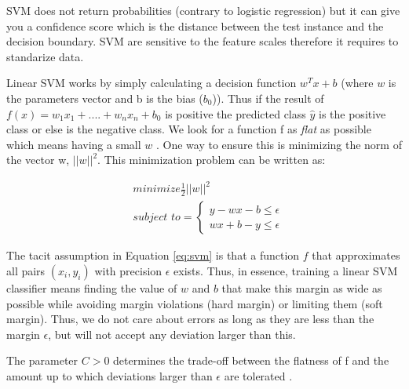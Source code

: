 \documentclass[11pt]{article}
\begin{document}
SVM does not return probabilities (contrary to logistic regression) but it can give you a confidence score which is the distance between the test instance and the decision boundary. SVM are sensitive to the feature scales therefore it requires to standarize data. 

Linear SVM works by simply calculating a decision function $w^Tx +b$ (where $w$ is the parameters vector and b is the bias ($b_0$)). Thus if the result of $f(x) = w_{1} x_{1} + ....+ w_{n}x_{n} + b_0$ is positive the predicted class $\hat{y}$ is the positive class or else is the negative class. We look for a function f as \emph{flat} as possible which means having a small $w$ . One way to ensure this is minimizing the norm of the vector w, $||w||^2$. This minimization problem can be written as:


\begin{equation}\label{eq:svm}
\begin{aligned}
 & \textit{minimize} \frac{1}{2} ||w||^2 \\
 & \textit{subject to}=
 \begin{cases}
    y - wx -b \leq \epsilon \\
    wx +b - y \leq \epsilon
  \end{cases}
  \end{aligned}
\end{equation}

The tacit assumption in Equation \ref{eq:svm} is that a function $f$ that approximates all pairs $(x_i, y_i)$ with precision $\epsilon$ exists.
Thus, in essence, training a linear SVM classifier means finding the value of $w$ and $b$ that make this margin as wide as possible while avoiding margin violations (hard margin) or limiting them (soft margin). Thus, we do not care about errors as long as they are less than the margin $\epsilon$, but will not
accept any deviation larger than this. 

The parameter $C > 0$ determines the trade-off between the flatness of f and the amount up to which deviations larger than $\epsilon$ are tolerated \cite{smola2004tutorial}. 

\end{document}
